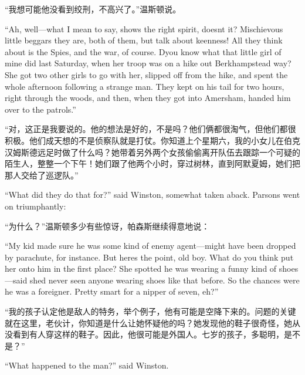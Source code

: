 \begin{paracol}{2}
\switchcolumn

``我想可能他没看到绞刑，不高兴了。''温斯顿说。

\switchcolumn*

``Ah, well---what I mean to say, shows the right spirit,
doesn\textquotesingle t it? Mischievous little beggars they are, both of
them, but talk about keenness! All they think about is the Spies, and
the war, of course. D\textquotesingle you know what that little girl of
mine did last Saturday, when her troop was on a hike out Berkhampstead
way? She got two other girls to go with her, slipped off from the hike,
and spent the whole afternoon following a strange man. They kept on his
tail for two hours, right through the woods, and then, when they got
into Amersham, handed him over to the patrols.''

\switchcolumn

``对，这正是我要说的。他的想法是好的，不是吗？他们俩都很淘气，但他们都很积极。他们成天想的不是侦察队就是打仗。你知道上个星期六，我的小女儿在伯克汉姆斯德远足时做了什么吗？她带着另外两个女孩偷偷离开队伍去跟踪一个可疑的陌生人，整整一个下午！她们跟了他两个小时，穿过树林，直到阿默夏姆，她们把那人交给了巡逻队。''

\switchcolumn*

``What did they do that for?'' said Winston, somewhat taken aback. Parsons
went on triumphantly:

\switchcolumn

``为什么？''温斯顿多少有些惊讶，帕森斯继续得意地说：

\switchcolumn*

``My kid made sure he was some kind of enemy agent---might have been
dropped by parachute, for instance. But here\textquotesingle s the
point, old boy. What do you think put her onto him in the first place?
She spotted he was wearing a funny kind of shoes---said
she\textquotesingle d never seen anyone wearing shoes like that before.
So the chances were he was a foreigner. Pretty smart for a nipper of
seven, eh?''

\switchcolumn

``我的孩子认定他是敌人的特务，举个例子，他有可能是空降下来的。问题的关键就在这里，老伙计，你知道是什么让她怀疑他的吗？她发现他的鞋子很奇怪，她从没看到有人穿这样的鞋子。因此，他很可能是外国人。七岁的孩子，多聪明，是不是？''

\switchcolumn*

``What happened to the man?'' said Winston.

\switchcolumn


\end{paracol}

